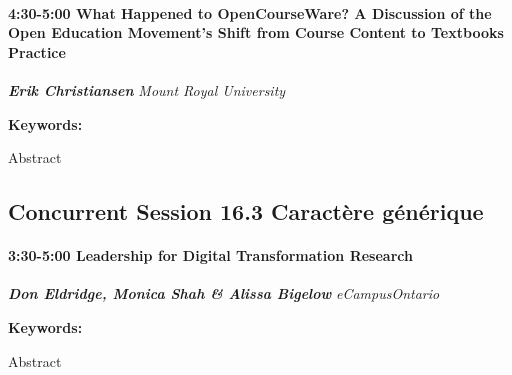 \documentclass[
]{book}
\begin{document}
\begin{session}
\hypertarget{what-happened-to-opencourseware-a-discussion-of-the-open-education-movements-shift-from-course-content-to-textbooks-practice}{%
\paragraph*{\texorpdfstring{4:30-5:00 \textbar{} \textbf{What Happened
to OpenCourseWare? A Discussion of the Open Education Movement's Shift
from Course Content to Textbooks} \textbar{}
Practice}{4:30-5:00 \textbar{} What Happened to OpenCourseWare? A Discussion of the Open Education Movement's Shift from Course Content to Textbooks \textbar{} Practice}}\label{what-happened-to-opencourseware-a-discussion-of-the-open-education-movements-shift-from-course-content-to-textbooks-practice}}

\textbf{\emph{Erik Christiansen}} \textbar{} \emph{Mount Royal
University}

\textbf{Keywords:}

Abstract
\end{session}

\hypertarget{concurrent-session-16.3-wildcard}{%
\subsection*{Concurrent Session 16.3 \textbar{} Caractère générique}\label{concurrent-session-16.3-wildcard}}

\begin{session}
\hypertarget{leadership-for-digital-transformation-research}{%
\paragraph*{\texorpdfstring{3:30-5:00 \textbar{} \textbf{Leadership for
Digital Transformation} \textbar{}
Research}{3:30-5:00 \textbar{} Leadership for Digital Transformation \textbar{} Research}}\label{leadership-for-digital-transformation-research}}

\textbf{\emph{Don Eldridge, Monica Shah \& Alissa Bigelow}} \textbar{}
\emph{eCampusOntario}

\textbf{Keywords:}

Abstract
\end{session}
\end{document}
